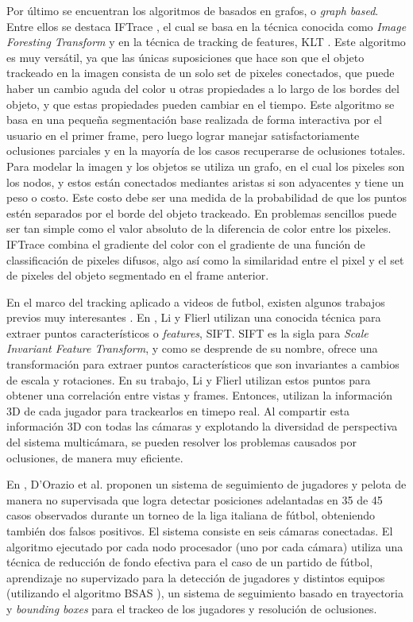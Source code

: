 \documentclass[twocolumn,a4paper,10pt]{article}
\begin{document}
Por último se encuentran los algoritmos de basados en grafos, o \textit{graph based}. Entre ellos se destaca IFTrace \cite{IFTrace}, el cual se basa en la técnica conocida como 
\textit{Image Foresting Transform} \cite{IFT} y en la técnica de tracking de features, KLT \cite{KLT}. Este algoritmo es muy versátil, ya que las únicas suposiciones que hace son que el objeto trackeado en la imagen consista de un
solo set de pixeles conectados, que puede haber un cambio aguda del color u otras propiedades a lo largo de los bordes del objeto, y que estas propiedades pueden cambiar en el 
tiempo. Este algoritmo se basa en una pequeña segmentación base realizada de forma interactiva por el usuario en el primer frame, pero luego lograr manejar satisfactoriamente
oclusiones parciales y en la mayoría de los casos recuperarse de oclusiones totales. Para modelar la imagen y los objetos se utiliza un grafo, en el cual los pixeles son los nodos, y
estos están conectados mediantes aristas si son adyacentes y tiene un peso o costo. Este costo debe ser una medida de la probabilidad de que los puntos estén separados por el borde del
objeto trackeado. En problemas sencillos puede ser tan simple como el valor absoluto de la diferencia de color entre los pixeles. IFTrace combina el gradiente del color con el 
gradiente de una función de classificación de pixeles difusos, algo así como la similaridad entre el pixel y el set de pixeles del objeto segmentado en el frame anterior.

En el marco del tracking aplicado a videos de futbol, existen algunos trabajos previos muy interesantes \cite{paper-suecia-soccer} \cite{papers-tanos}. En \cite{paper-suecia-soccer},
Li y Flierl utilizan una conocida técnica para extraer puntos característicos o \textit{features}, SIFT. SIFT es la sigla para \textit{Scale Invariant Feature Transform}, y como se 
desprende de su nombre, ofrece una transformación para extraer puntos característicos que son invariantes a cambios de escala y rotaciones. En su trabajo, Li y Flierl utilizan estos 
puntos para obtener una correlación entre vistas y frames. Entonces, utilizan la información 3D de cada jugador para trackearlos en timepo real. Al compartir esta información 3D con
todas las cámaras y explotando la diversidad de perspectiva del sistema multicámara, se pueden resolver los problemas causados por oclusiones, de manera muy eficiente.

En \cite{papers-tanos}, D'Orazio et al. proponen un sistema de seguimiento de
jugadores y pelota de manera no supervisada que logra detectar posiciones
adelantadas en 35 de 45 casos observados durante un torneo de la liga italiana
de fútbol, obteniendo también dos falsos positivos. El sistema consiste en seis
cámaras conectadas. El algoritmo ejecutado por cada nodo procesador (uno por
cada cámara) utiliza una técnica de reducción de fondo efectiva para el caso de
un partido de fútbol, aprendizaje no supervizado para la detección de jugadores
y distintos equipos (utilizando el algoritmo BSAS \cite{paper-bsas}), un
sistema de seguimiento basado en trayectoria y \textit{bounding boxes} para el
trackeo de los jugadores y resolución de oclusiones.
\end{document}
